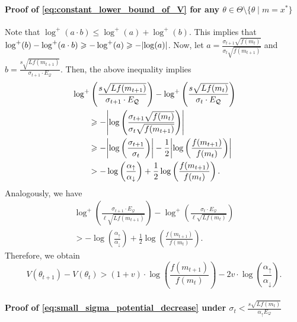\documentclass[journal]{IEEEtran}
\renewcommand{\geq}{\geqslant} %
\renewcommand{\leq}{\leqslant} %
\DeclarePairedDelimiter{\abs}{\lvert}{\rvert}
\theoremstyle{definition}
\newcommand{\yohe}[1]{{\color{cyan}Y.A.: #1}}
\newcommand{\aup}{\alpha_{\uparrow}}
\newcommand{\adown}{\alpha_{\downarrow}}
\begin{document}
\paragraph{Proof of \eqref{eq:constant_lower_bound_of_V} for any $\theta\in\Theta\setminus\{\theta\mid m= x^*\}$}
Note that $\log^+(a \cdot b) \leq \log^+(a) + \log^+(b)$. This implies that $\log^+(b) - \log^+(a \cdot b) \geq - \log^+(a) \geq -\abs{\log(a)}$. Now, let $a = \frac{\sigma_{t+1} \sqrt{ f(m_{t})}}{ \sigma_{t} \sqrt{f(m_{t+1})} }$ and $b = \frac{s\sqrt{ Lf(m_{t+1})}}{\sigma_{t+1}\cdot E_\mathcal{Q} }$. Then, the above inequality implies 
\begin{equation}
\begin{split}
\MoveEqLeft[2]\log^+\left( \frac{s\sqrt{ Lf(m_{t+1})}}{\sigma_{t+1}\cdot E_\mathcal{Q} } \right) - \log^+\left( \frac{s\sqrt{ Lf(m_{t})}}{\sigma_{t}\cdot E_\mathcal{Q} } \right) 
\\
&\geq - \abs*{\log\left( \frac{\sigma_{t+1} \sqrt{ f(m_{t})}}{ \sigma_{t} \sqrt{f(m_{t+1})} } \right)}
\\
&\geq - \abs*{\log\left(\frac{\sigma_{t+1}}{\sigma_t}\right)} - \frac12 \abs*{\log\left( \frac{ f(m_{t+1}) } { f(m_{t}) }\right)}
\\
&> - \log\left(\frac{\aup}{\adown}\right) + \frac12 \log\left( \frac{ f(m_{t+1}) } { f(m_{t}) }\right) .
\end{split}
\end{equation}
Analogously, we have
\begin{multline}
\log^+\left( \frac{\sigma_{t+1} \cdot E_\mathcal{Q}}{\ell\sqrt{Lf(m_{t+1})}} \right) - \log^+\left( \frac{\sigma_t \cdot E_\mathcal{Q}}{\ell\sqrt{Lf(m_t)}} \right) 
\\
> - \log\left(\frac{\aup}{\adown}\right) + \frac12 \log\left( \frac{ f(m_{t+1}) } { f(m_{t}) }\right) .
\end{multline}
Therefore, we obtain
\begin{equation}
V(\theta_{t+1}) - V(\theta_t) > (1 + v) \cdot \log\left( \frac{ f(m_{t+1}) } { f(m_{t}) }\right) - 2 v \cdot \log\left(\frac{\aup}{\adown}\right) .
\end{equation}


\paragraph{Proof of \eqref{eq:small_sigma_potential_decrease} under $\sigma_t < \frac{s\sqrt{L f(m_t)}}{\aup E_\mathcal{Q}}$}
\end{document}
